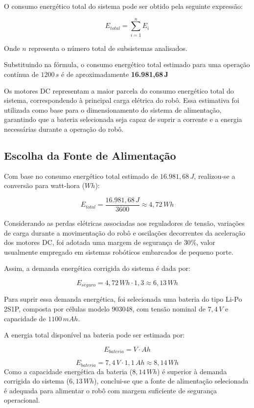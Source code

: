 O consumo energético total do sistema pode ser obtido pela seguinte expressão:

\[
E_{total} = \sum_{i=1}^{n} E_i
\]

Onde $n$ representa o número total de subsistemas analisados.


Substituindo na fórmula, o consumo energético total estimado para uma operação contínua de $1200\,s$ é de aproximadamente
\textbf{16.981,68\,J}

Os motores DC representam a maior parcela do consumo energético total do sistema, correspondendo à principal carga elétrica do robô. Essa estimativa foi utilizada como base para o dimensionamento do sistema de alimentação, garantindo que a bateria selecionada seja capaz de suprir a corrente e a energia necessárias durante a operação do robô.

\subsection{Escolha da Fonte de Alimentação}

Com base no consumo energético total estimado de $16.981,68\,J$, realizou-se a conversão para watt-hora ($Wh$):

\[
E_{total} = \frac{16.981,68\,J}{3600} \approx 4,72\,Wh
\]

Considerando as perdas elétricas associadas aos reguladores de tensão, variações de carga durante a movimentação do robô e oscilações decorrentes da aceleração dos motores DC, foi adotada uma margem de segurança de $30\%$, valor usualmente empregado em sistemas robóticos embarcados de pequeno porte.

Assim, a demanda energética corrigida do sistema é dada por:

\[
E_{seguro} = 4,72\,Wh \cdot 1,3 \approx 6,13\,Wh
\]

Para suprir essa demanda energética, foi selecionada uma bateria do tipo Li-Po 2S1P, composta por células modelo 903048, com tensão nominal de $7,4\,V$ e capacidade de $1100\,mAh$.

A energia total disponível na bateria pode ser estimada por:

\[
E_{bateria} = V \cdot Ah
\]

\[
E_{bateria} = 7,4\,V \cdot 1,1\,Ah \approx 8,14\,Wh
\]
Como a capacidade energética da bateria ($8,14\,Wh$) é superior à demanda corrigida do sistema ($6,13\,Wh$), conclui-se que a fonte de alimentação selecionada é adequada para alimentar o robô com margem suficiente de segurança operacional.

